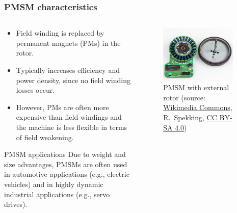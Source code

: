 \begin{frame}
	\frametitle{PMSM characteristics}	
    \begin{columns}
		\begin{column}{0.5\textwidth}
			\begin{itemize}
				\item<1-> Field winding is replaced by permanent magnets (PMs) in the rotor.
				\item<2-> Typically increases efficiency and power density, since no field winding losses occur.
				\item<3-> However, PMs are often more expensive than field windings and the machine is less flexible in terms of field weakening.
			\end{itemize}
			\vspace{-0.25cm}
			\begin{varblock}
				{PMSM applications}
					Due to weight and size advantages, PMSMs are often used in automotive applications (e.g., electric vehicles) and in highly dynamic industrial applications (e.g., servo drives).
			\end{varblock}
		\end{column}
        \begin{column}{0.5\textwidth}
			\onslide<1->
            \begin{figure}
                \centering
                \includegraphics[width=0.9\textwidth]{fig/lec07/External_rotor_PMSM.jpg}
                \caption{PMSM with external rotor (source: \href{https://commons.wikimedia.org/wiki/File:General_Technic_GT_9840_-_capstan_motor-6683.jpg}{Wikimedia Commons},  R.~Spekking, \href{https://creativecommons.org/licenses/by-sa/4.0/deed}{CC BY-SA 4.0})}
                \label{fig:External_rotor_PMSM}
            \end{figure}
        \end{column}
    \end{columns}
\end{frame}

